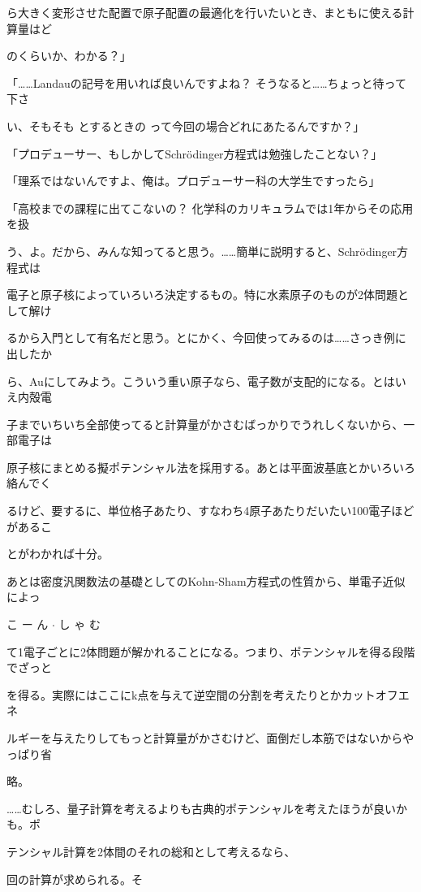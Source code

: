 ら⼤きく変形させた配置で原⼦配置の最適化を⾏いたいとき、まともに使える計算量はど\par
のくらいか、わかる？」\par
「……Landauの記号を⽤いれば良いんですよね？ そうなると……ちょっと待って下さ\par
い、そもそも  とするときの  って今回の場合どれにあたるんですか？」\par
「プロデューサー、もしかしてSchrödinger⽅程式は勉強したことない？」\par
「理系ではないんですよ、俺は。プロデューサー科の⼤学⽣ですったら」\par
「⾼校までの課程に出てこないの？ 化学科のカリキュラムでは1年からその応⽤を扱\par
う、よ。だから、みんな知ってると思う。……簡単に説明すると、Schrödinger⽅程式は\par
電⼦と原⼦核によっていろいろ決定するもの。特に⽔素原⼦のものが2体問題として解け\par
るから⼊⾨として有名だと思う。とにかく、今回使ってみるのは……さっき例に出したか\par
ら、Auにしてみよう。こういう重い原⼦なら、電⼦数が⽀配的になる。とはいえ内殻電\par
⼦までいちいち全部使ってると計算量がかさむばっかりでうれしくないから、⼀部電⼦は\par
原⼦核にまとめる擬ポテンシャル法を採⽤する。あとは平⾯波基底とかいろいろ絡んでく\par
るけど、要するに、単位格⼦あたり、すなわち4原⼦あたりだいたい100電⼦ほどがあるこ\par
とがわかれば⼗分。\par
あとは密度汎関数法の基礎としてのKohn-Sham⽅程式の性質から、単電⼦近似によっ\par
こ ー ん $\cdot$ し ゃ む\par
て1電⼦ごとに2体問題が解かれることになる。つまり、ポテンシャルを得る段階でざっと\par
を得る。実際にはここにk点を与えて逆空間の分割を考えたりとかカットオフエネ\par
ルギーを与えたりしてもっと計算量がかさむけど、⾯倒だし本筋ではないからやっぱり省\par
略。\par
……むしろ、量⼦計算を考えるよりも古典的ポテンシャルを考えたほうが良いかも。ポ\par
テンシャル計算を2体間のそれの総和として考えるなら、\par
回の計算が求められる。そ\par
